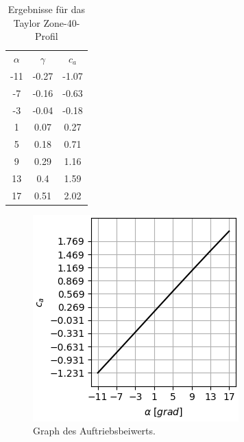 \begin{minipage}{0.45\textwidth}
\begin{table}[H]
    \centering
    \begin{tabular}{c|cc}
    $\alpha$ & $\gamma$ & $c_a$ \\
        -11 & -0.27 & -1.07 \\ 
-7 & -0.16 & -0.63 \\ 
-3 & -0.04 & -0.18 \\ 
1 & 0.07 & 0.27 \\ 
5 & 0.18 & 0.71 \\ 
9 & 0.29 & 1.16 \\ 
13 & 0.4 & 1.59 \\ 
17 & 0.51 & 2.02 \\ 
    \end{tabular}
    \label{tab:zone}
    \caption{Ergebnisse für das Taylor Zone-40-Profil}
\end{table}
\end{minipage}
\hfill
\begin{minipage}{0.45\textwidth}
\begin{figure}[H]
    \centering
    \includegraphics[scale=0.6]{figures/zoneca.png}
    \caption{Graph des Auftriebsbeiwerts.}
    \label{fig:zoneca}
\end{figure}
\end{minipage}

